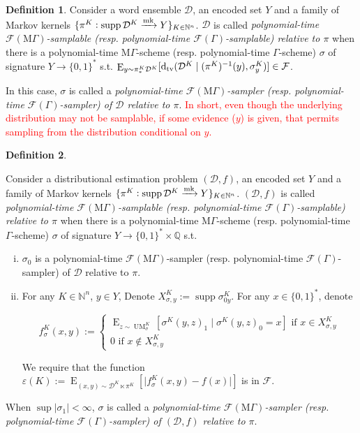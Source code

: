 \documentclass[11pt]{article}
\numberwithin{equation}{section}
\theoremstyle{definition}
\newtheorem{definition}{Definition}[section]
\theoremstyle{plain}
\newcommand{\Bool}{\{0,1\}}
\newcommand{\Words}{{\Bool^*}}
\DeclareMathOperator{\Supp}{supp}
\DeclareMathOperator{\E}{E}
\DeclareMathOperator{\UM}{UM}
\newcommand{\Dtv}{\operatorname{d}_{\textnormal{tv}}}
\newcommand{\Nats}{\mathbb{N}}
\newcommand{\Rats}{\mathbb{Q}}
\newcommand{\Abs}[1]{\lvert #1 \rvert}
\newcommand{\Dist}{\mathcal{D}}
\newcommand{\MGrow}{\mathrm{M}\Gamma}
\newcommand{\Fall}{\mathcal{F}}
\newcommand{\EG}{\Fall(\Gamma)}
\newcommand{\EMG}{\Fall(\MGrow)}
\newcommand{\Markov}{\xrightarrow{\textnormal{mk}}}
\begin{document}
\begin{definition}

Consider a word ensemble $\Dist$, an encoded set $Y$ and a family of Markov kernels ${\{\pi^K: \Supp \Dist^{K} \Markov Y\}_{K \in \Nats^n}}$. $\Dist$ is called \emph{polynomial-time $\EMG$-samplable (resp. polynomial-time $\EG$-samplable) relative to $\pi$} when there is a polynomial-time $\MGrow$-scheme (resp. polynomial-time $\Gamma$-scheme) $\sigma$ of signature $Y \rightarrow \Words$ s.t. ${\E_{y \sim \pi_*^K\Dist^{K}}[\Dtv(\Dist^K \mid (\pi^K)^{-1}(y),\sigma_y^K)] \in \Fall}$.

In this case, $\sigma$ is called a \emph{polynomial-time $\EMG$-sampler (resp. polynomial-time $\EG$-sampler) of $\Dist$ relative to $\pi$}. \textcolor{red}{In short, even though the underlying distribution may not be samplable, if some evidence ($y$) is given, that permits sampling from the distribution conditional on $y$.}

\end{definition}

\begin{samepage}
\begin{definition}
\label{def:smp_prob_rel}

Consider a distributional estimation problem $(\Dist,f)$, an encoded set $Y$ and a family of Markov kernels $\{\pi^K: \Supp \Dist^{K} \Markov Y\}_{K \in \Nats^n}$. $(\Dist,f)$ is called \emph{polynomial-time $\EMG$-samplable (resp. polynomial-time $\EG$-samplable) relative to $\pi$} when there is a polynomial-time $\MGrow$-scheme (resp. polynomial-time $\Gamma$-scheme) $\sigma$ of signature $Y \rightarrow \Words \times \Rats$ s.t.

\begin{enumerate}[(i)]

\item $\sigma_0$ is a polynomial-time $\EMG$-sampler (resp. polynomial-time $\EG$-sampler) of $\Dist$ relative to $\pi$.

\item For any $K \in \Nats^n$, $y \in Y$, Denote $X_{\sigma,y}^K:=\Supp \sigma_{0y}^K$. For any ${x \in \Words}$, denote 

$$f_\sigma^K(x,y):=\begin{cases}\E_{z \sim\UM_\sigma^K}[\sigma^K(y,z)_1 \mid \sigma^K(y,z)_0 = x] \text{ if } x \in X_{\sigma,y}^K \\ 0 \text{ if } x \not\in X_{\sigma,y}^K \end{cases}$$

We require that the function ${\varepsilon(K):=\E_{(x,y) \sim \Dist^{K} \ltimes \pi^K}[\Abs{f_\sigma^K(x,y)-f(x)}]}$ is in $\Fall$.

\end{enumerate}

When $\sup{\Abs{\sigma_1}} < \infty$, $\sigma$ is called a \emph{polynomial-time $\EMG$-sampler (resp. polynomial-time $\EG$-sampler) of $(\Dist,f)$ relative to $\pi$}.

\end{definition}
\end{samepage}
\end{document}
